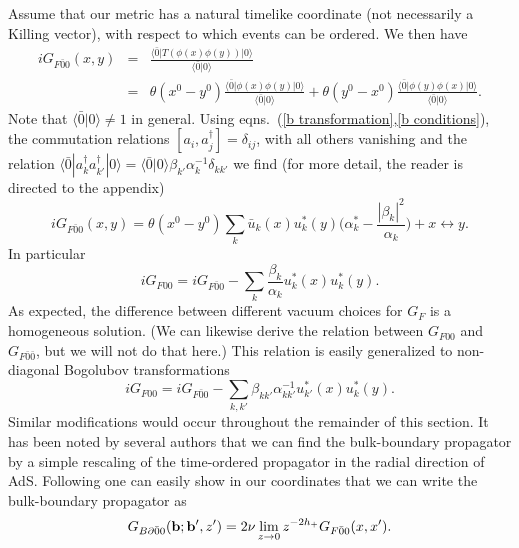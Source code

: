\documentclass[a4paper,aps,prd,preprintnumbers,groupedaddress]{revtex4}
\begin{document}
Assume that our
metric has a natural timelike coordinate (not necessarily a Killing vector), with respect to which events can be ordered.  We then have
\begin{eqnarray}\label{feynman two point function definition}
iG_{F\bar{0}{0}} (x,y) &=& \frac{\langle \bar{0} | T(\phi(x) \phi(y) ) | 0 \rangle }{\langle \bar{0} | 0 \rangle } \nonumber \\
&=& \theta(x^0-y^0) \frac{\langle \bar{0} | \phi(x) \phi(y)| 0 \rangle }{\langle \bar{0} | 0 \rangle } +\theta(y^0-x^0) \frac{\langle \bar{0}
| \phi(y) \phi(x)| 0 \rangle }{\langle \bar{0} | 0 \rangle }.
\end{eqnarray}
Note that $\langle \bar{0} | 0 \rangle \neq 1$ in general. Using eqns.\ (\ref{b transformation},\ref{b conditions}), the commutation
relations $[a_i, a^\dagger_j]=\delta_{ij}$, with all others vanishing and the relation \cite{dewitt} $\langle \bar{0}| a_k ^\dagger a_{k'}
^\dagger |0 \rangle=\langle \bar{0}|0 \rangle \beta_{k'} \alpha_k ^{-1} \delta_{kk'}$ we find (for more detail, the reader is directed to
the appendix)
\begin{equation} \label{feynman two point function solution}
iG_{F\bar{0}{0}} (x,y) = \theta(x^0-y^0) \sum_k \bar{u}_k (x) u_k ^* (y) \bigl( \alpha_k ^* - \frac{ |\beta_k| ^2}{\alpha_k} \bigr) +
x\leftrightarrow y.
\end{equation}
In particular
\begin{equation} \label{in in in out bulk}
iG_{F00}= iG_{F\bar{0}{0}} - \sum_k \frac{\beta_k}{\alpha_k} u_k^*(x)u_k^*(y) .
\end{equation}
As expected, the difference between different vacuum choices for $G_F$ is a homogeneous solution.  (We can likewise derive the relation between $G_{F00}$ and $G_{F\bar{0}\bar{0}}$, but we will not do that here.)    This relation is easily generalized to non-diagonal Bogolubov
transformations
\begin{equation}
iG_{F00}= iG_{F\bar{0}{0}} - \sum_{k,k'} \beta_{kk'}\alpha^{-1}_{kk'} u_{k'}^*(x)u_k^*(y) .
\end{equation}
Similar modifications would occur throughout the remainder of this section.
It has been noted by several authors \cite{banks98,vijay99,giddings99} that we can find the bulk-boundary propagator by a simple rescaling
of the time-ordered propagator in the radial direction of AdS.
Following \cite{giddings99} one can easily show in our coordinates that we can write the
bulk-boundary propagator as
\begin{equation}
G_{B\partial \bar{0} 0} ({\bf b}; {\bf b'}, z') = 2 \nu \lim_{z \rightarrow 0} z^{-2h_+} G_{F \bar{0} 0} (x,x') .
\end{equation}
\end{document}
